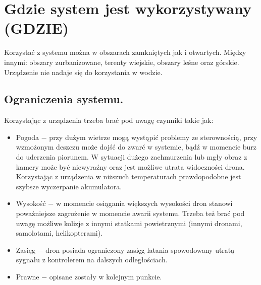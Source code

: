 \documentclass[12pt]{article}
\begin{document}
\section{Gdzie system jest wykorzystywany (GDZIE)}
Korzystać z systemu można w obszarach zamkniętych jak i otwartych. Między innymi: obszary zurbanizowane, terenty wiejskie, obszary leśne oraz górskie. Urządzenie nie nadaje się do korzystania w wodzie. 

\subsection{Ograniczenia systemu.}
Korzystając z urządzenia trzeba brać pod uwagę czynniki takie jak: 
\begin{itemize}
    \item Pogoda $-$ przy dużym wietrze mogą wystąpić problemy ze sterownością, przy wzmożonym deszczu może dojść do zwarć w systemie, bądź w momencie burz do uderzenia piorunem. W sytuacji dużego zachmurzenia lub mgły obraz z kamery może być niewyraźny oraz jest możliwe utrata widoczności drona. Korzystając z urządzenia w niższuch temperaturach prawdopodobne jest szybsze wyczerpanie akumulatora. 
    \item Wysokość $-$ w momencie osiągania większych wysokości dron stanowi poważniejsze zagrożenie w momencie awarii systemu. Trzeba też brać pod uwagę możliwe kolizje z innymi statkami powietrznymi (innymi dronami, samolotami, helikopterami).
    \item Zasięg $-$ dron posiada ograniczony zasięg latania spowodowany utratą sygnału z kontrolerem na dalszych odległościach.
    \item Prawne $-$ opisane zostały w kolejnym punkcie.
\end{itemize}
\end{document}
